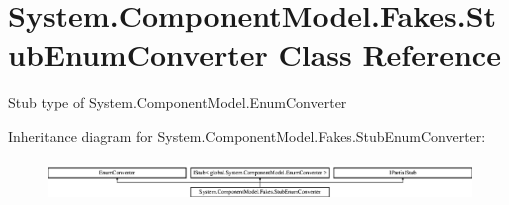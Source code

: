 \hypertarget{class_system_1_1_component_model_1_1_fakes_1_1_stub_enum_converter}{\section{System.\-Component\-Model.\-Fakes.\-Stub\-Enum\-Converter Class Reference}
\label{class_system_1_1_component_model_1_1_fakes_1_1_stub_enum_converter}
}


Stub type of System.\-Component\-Model.\-Enum\-Converter 


Inheritance diagram for System.\-Component\-Model.\-Fakes.\-Stub\-Enum\-Converter\-:\begin{figure}[H]
\begin{center}
\leavevmode
\includegraphics[height=1.085271cm]{class_system_1_1_component_model_1_1_fakes_1_1_stub_enum_converter}
\end{center}
\end{figure}
